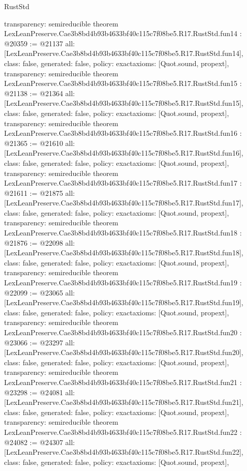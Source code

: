 \begin{lexlean}{RustStd}
\begin{coremodule}
{  transparency: semireducible
}
theorem LexLeanPreserve.Cae3b8bd4b93b4633bf40c115c7f08be5.R17.RustStd.fun14 : @20359 := @21137 {
  all: [LexLeanPreserve.Cae3b8bd4b93b4633bf40c115c7f08be5.R17.RustStd.fun14],
  class: false,
  generated: false,
  policy: exact{axioms: [Quot.sound, propext]},
  transparency: semireducible
}
theorem LexLeanPreserve.Cae3b8bd4b93b4633bf40c115c7f08be5.R17.RustStd.fun15 : @21138 := @21364 {
  all: [LexLeanPreserve.Cae3b8bd4b93b4633bf40c115c7f08be5.R17.RustStd.fun15],
  class: false,
  generated: false,
  policy: exact{axioms: [Quot.sound, propext]},
  transparency: semireducible
}
theorem LexLeanPreserve.Cae3b8bd4b93b4633bf40c115c7f08be5.R17.RustStd.fun16 : @21365 := @21610 {
  all: [LexLeanPreserve.Cae3b8bd4b93b4633bf40c115c7f08be5.R17.RustStd.fun16],
  class: false,
  generated: false,
  policy: exact{axioms: [Quot.sound, propext]},
  transparency: semireducible
}
theorem LexLeanPreserve.Cae3b8bd4b93b4633bf40c115c7f08be5.R17.RustStd.fun17 : @21611 := @21875 {
  all: [LexLeanPreserve.Cae3b8bd4b93b4633bf40c115c7f08be5.R17.RustStd.fun17],
  class: false,
  generated: false,
  policy: exact{axioms: [Quot.sound, propext]},
  transparency: semireducible
}
theorem LexLeanPreserve.Cae3b8bd4b93b4633bf40c115c7f08be5.R17.RustStd.fun18 : @21876 := @22098 {
  all: [LexLeanPreserve.Cae3b8bd4b93b4633bf40c115c7f08be5.R17.RustStd.fun18],
  class: false,
  generated: false,
  policy: exact{axioms: [Quot.sound, propext]},
  transparency: semireducible
}
theorem LexLeanPreserve.Cae3b8bd4b93b4633bf40c115c7f08be5.R17.RustStd.fun19 : @22099 := @23065 {
  all: [LexLeanPreserve.Cae3b8bd4b93b4633bf40c115c7f08be5.R17.RustStd.fun19],
  class: false,
  generated: false,
  policy: exact{axioms: [Quot.sound, propext]},
  transparency: semireducible
}
theorem LexLeanPreserve.Cae3b8bd4b93b4633bf40c115c7f08be5.R17.RustStd.fun20 : @23066 := @23297 {
  all: [LexLeanPreserve.Cae3b8bd4b93b4633bf40c115c7f08be5.R17.RustStd.fun20],
  class: false,
  generated: false,
  policy: exact{axioms: [Quot.sound, propext]},
  transparency: semireducible
}
theorem LexLeanPreserve.Cae3b8bd4b93b4633bf40c115c7f08be5.R17.RustStd.fun21 : @23298 := @24081 {
  all: [LexLeanPreserve.Cae3b8bd4b93b4633bf40c115c7f08be5.R17.RustStd.fun21],
  class: false,
  generated: false,
  policy: exact{axioms: [Quot.sound, propext]},
  transparency: semireducible
}
theorem LexLeanPreserve.Cae3b8bd4b93b4633bf40c115c7f08be5.R17.RustStd.fun22 : @24082 := @24307 {
  all: [LexLeanPreserve.Cae3b8bd4b93b4633bf40c115c7f08be5.R17.RustStd.fun22],
  class: false,
  generated: false,
  policy: exact{axioms: [Quot.sound, propext]},
}
\end{coremodule}
\end{lexlean}

